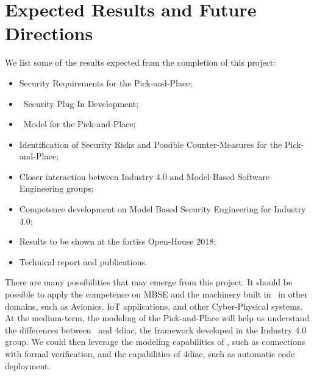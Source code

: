 \section{Expected Results and Future Directions} 

We list some of the results expected from the completion of this project:

\begin{itemize}
  \item Security Requirements for the Pick-and-Place;
  \item \autofocus\ Security Plug-In Development;
  \item \autofocus\ Model for the Pick-and-Place;
  \item Identification of Security Risks and Possible Counter-Measures for the Pick-and-Place;
  \item Closer interaction between Industry 4.0 and Model-Based Software Engineering groups;
  \item Competence development on Model Based Security Engineering for Industry 4.0;
  \item Results to be shown at the fortiss Open-House 2018;
  \item Technical report and publications.
\end{itemize}


There are many possibilities that may emerge from this project. It should be possible to apply the competence on MBSE and the machinery built in \autofocus\ in other domains, such as Avionics, IoT applications, and other Cyber-Physical systems. At the medium-term, the modeling of the Pick-and-Place will help us understand the differences between \autofocus\ and 4diac, the framework developed in the Industry 4.0 group. We could then leverage the modeling capabilities of \autofocus, such as connections with formal verification, and the capabilities of 4diac, such as automatic code deployment.


 


